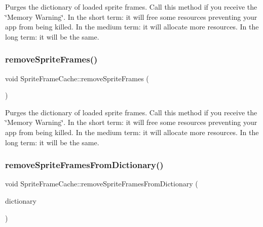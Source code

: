 Purges the dictionary of loaded sprite frames. Call this method if you receive the \char`\"{}\+Memory Warning\char`\"{}. In the short term\+: it will free some resources preventing your app from being killed. In the medium term\+: it will allocate more resources. In the long term\+: it will be the same. \mbox{\label{classSpriteFrameCache_ad39158545a4c85b1ef33187450e1e7f0}} 
\subsubsection{\texorpdfstring{remove\+Sprite\+Frames()}{removeSpriteFrames()}\hspace{0.1cm}{\footnotesize\ttfamily [2/2]}}
{\footnotesize\ttfamily void Sprite\+Frame\+Cache\+::remove\+Sprite\+Frames (\begin{DoxyParamCaption}{ }\end{DoxyParamCaption})}

Purges the dictionary of loaded sprite frames. Call this method if you receive the \char`\"{}\+Memory Warning\char`\"{}. In the short term\+: it will free some resources preventing your app from being killed. In the medium term\+: it will allocate more resources. In the long term\+: it will be the same. \mbox{\label{classSpriteFrameCache_ad9903fd9759969671fefe7721f3a7071}} 
\subsubsection{\texorpdfstring{remove\+Sprite\+Frames\+From\+Dictionary()}{removeSpriteFramesFromDictionary()}\hspace{0.1cm}{\footnotesize\ttfamily [1/2]}}
{\footnotesize\ttfamily void Sprite\+Frame\+Cache\+::remove\+Sprite\+Frames\+From\+Dictionary (\begin{DoxyParamCaption}\item[{Value\+Map \&}]{dictionary }\end{DoxyParamCaption})\hspace{0.3cm}{\ttfamily [protected]}}

